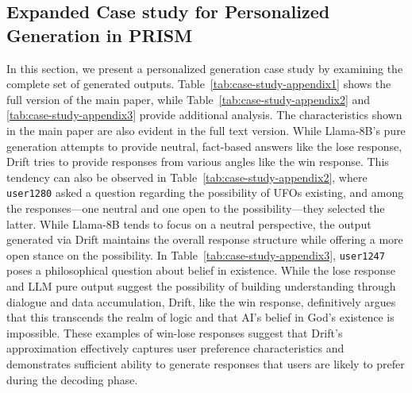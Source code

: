 
\subsection{Expanded Case study for Personalized Generation in PRISM}
\label{app:prism_analysis_section}



In this section, we present a personalized generation case study by examining the complete set of generated outputs. Table~\ref{tab:case-study-appendix1} shows the full version of the main paper, while Table~\ref{tab:case-study-appendix2} and \ref{tab:case-study-appendix3} provide additional analysis. The characteristics shown in the main paper are also evident in the full text version. While Llama-8B's pure generation attempts to provide neutral, fact-based answers like the lose response, Drift tries to provide responses from various angles like the win response. This tendency can also be observed in Table~\ref{tab:case-study-appendix2}, where \texttt{user1280} asked a question regarding the possibility of UFOs existing, and among the responses—one neutral and one open to the possibility—they selected the latter. While Llama-8B tends to focus on a neutral perspective, the output generated via Drift maintains the overall response structure while offering a more open stance on the possibility. In Table~\ref{tab:case-study-appendix3}, \texttt{user1247} poses a philosophical question about belief in existence. While the lose response and LLM pure output suggest the possibility of building understanding through dialogue and data accumulation, Drift, like the win response, definitively argues that this transcends the realm of logic and that AI's belief in God's existence is impossible. These examples of win-lose responses suggest that Drift's approximation effectively captures user preference characteristics and demonstrates sufficient ability to generate responses that users are likely to prefer during the decoding phase.



